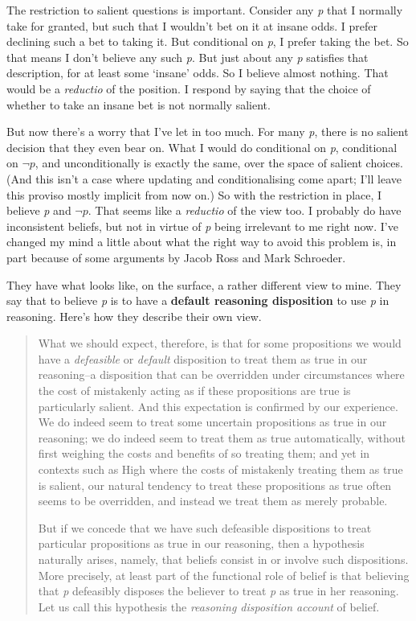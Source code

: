 The restriction to salient questions is important. Consider any \emph{p} that I normally take for granted, but such that I wouldn't bet on it at insane odds. I prefer declining such a bet to taking it. But conditional on \emph{p}, I prefer taking the bet. So that means I don't believe any such \emph{p}. But just about any \emph{p} satisfies that description, for at least some `insane' odds. So I believe almost nothing. That would be a \emph{reductio} of the position. I respond by saying that the choice of whether to take an insane bet is not normally salient.

But now there's a worry that I've let in too much. For many \emph{p}, there is no salient decision that they even bear on. What I would do conditional on \emph{p}, conditional on $\neg p$, and unconditionally is exactly the same, over the space of salient choices. (And this isn't a case where updating and conditionalising come apart; I'll leave this proviso mostly implicit from now on.) So with the restriction in place, I believe \emph{p} and $\neg p$. That seems like a \emph{reductio} of the view too. I probably do have inconsistent beliefs, but not in virtue of \emph{p} being irrelevant to me right now. I've changed my mind a little about what the right way to avoid this problem is, in part because of some arguments by Jacob Ross and Mark Schroeder. 

They have what looks like, on the surface, a rather different view to mine. They say that to believe \emph{p} is to have a \textbf{default reasoning disposition} to use \emph{p} in reasoning. Here's how they describe their own view.

\begin{quote}

What we should expect, therefore, is that for some propositions we would have a \emph{defeasible} or \emph{default} disposition to treat them as true in our reasoning--a disposition that can be overridden under circumstances where the cost of mistakenly acting as if these propositions are true is particularly salient. And this expectation is confirmed by our experience. We do indeed seem to treat some uncertain propositions as true in our reasoning; we do indeed seem to treat them as true automatically, without first weighing the costs and benefits of so treating them; and yet in contexts such as High where the costs of mistakenly treating them as true is salient, our natural tendency to treat these propositions as true often seems to be overridden, and instead we treat them as merely probable.

But if we concede that we have such defeasible dispositions to treat particular propositions as true in our reasoning, then a hypothesis naturally arises, namely, that beliefs consist in or involve such dispositions. More precisely, at least part of the functional role of belief is that believing that \emph{p} defeasibly disposes the believer to treat \emph{p} as true in her reasoning. Let us call this hypothesis the \emph{reasoning disposition account} of belief. \cite[9-10]{SchroederRoss2012}
\end{quote}

